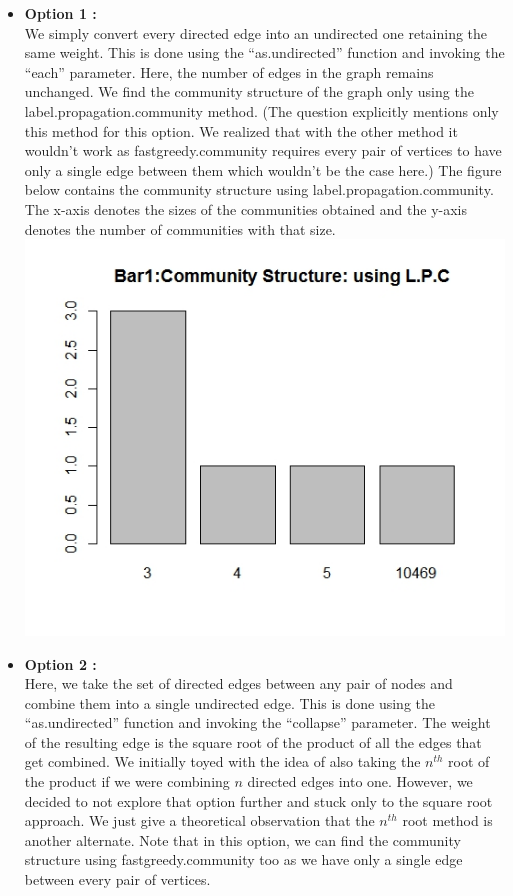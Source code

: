 \documentclass{article}
\begin{document}
\begin{itemize}
 \item \textbf{Option 1 :}\\
 We simply convert every directed edge into an undirected one retaining the same weight.
 This is done using the ``as.undirected'' function and invoking the ``each'' parameter.
 Here, the number of edges in the graph remains unchanged. 
 We find the community structure of the graph only using the 
 label.propagation.community method. (The question explicitly mentions only this method for this option. We realized 
 that with the other method it wouldn't work as fastgreedy.community requires every pair of vertices to have only a single
 edge between them which wouldn't be the case here.) The figure below contains
 the community structure using label.propagation.community. The x-axis denotes the sizes of the communities obtained
 and the y-axis denotes the number of communities with that size.\\
 \includegraphics[scale=0.4]{p3} 
 \item \textbf{Option 2 :}\\
 Here, we take the set of directed edges between any pair of nodes and combine them into a single undirected edge.
 This is done using the ``as.undirected'' function and invoking the ``collapse'' parameter.
 The weight of the resulting edge is the square root of the product of all the edges that get combined. We initially toyed 
 with the idea of also taking the $n^{th}$ root of the product if we were combining $n$ directed edges into one.
 However, we decided to not explore that option further and stuck only to the square root approach. We just give a theoretical
 observation that the $n^{th}$ root method is another alternate.
 Note that in this option, we can find the community structure using fastgreedy.community too as we have only a single
 edge between every pair of vertices.\\
 

\end{itemize}
\end{document}
